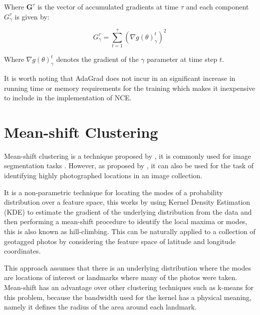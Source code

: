 Where $\mathbf{G}^{\tau}$ is the vector of accumulated gradients at time $\tau$ and each component $G^{\tau}_\gamma$ is given by:

\begin{equation}
G^{\tau}_{\gamma} = \sum_{t=1}^{\tau} \left(\nabla g(\theta)^{t}_{\gamma}\right)^{2}
\label{eq:adagrad-g}
\end{equation}

Where $\nabla g(\theta)^{t}_{\gamma}$ denotes the gradient of the $\gamma$ parameter at time step $t$.

It is worth noting that AdaGrad does not incur in an significant increase in running time or memory requirements for the training which makes it inexpensive to include in the implementation of NCE.

\section{Mean-shift Clustering}

Mean-shift clustering is a technique proposed by \citet{cheng1995mean}, it is commonly used for image segmentation tasks \citep{comaniciu2002mean}. However, as proposed by \citet{Kleinberg2009}, it can also be used for the task of identifying highly photographed locations in an image collection.

It is a non-parametric technique for locating the modes of a probability distribution over a feature space, this works by using Kernel Density Estimation (KDE) to estimate the gradient of the underlying distribution from the data and then performing a mean-shift procedure to identify the local maxima or modes, this is also known as hill-climbing. This can be naturally applied to a collection of geotagged photos by considering the feature space of latitude and longitude coordinates.

This approach assumes that there is an underlying distribution where the modes are locations of interest or landmarks where many of the photos were taken. Mean-shift has an advantage over other clustering techniques such as k-means for this problem, because the bandwidth used for the kernel has a physical meaning, namely it defines the radius of the area around each landmark.


